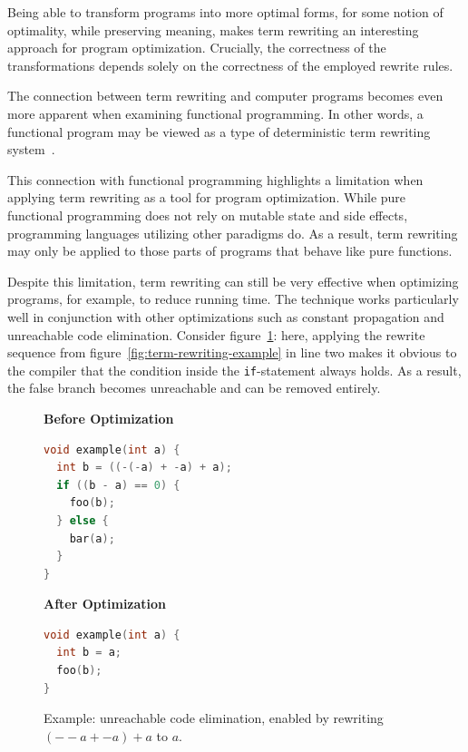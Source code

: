 Being able to transform programs into more optimal forms, for some notion of optimality, while preserving meaning, makes term rewriting an interesting approach for program optimization. Crucially, the correctness of the transformations depends solely on the correctness of the employed rewrite rules. 

The connection between term rewriting and computer programs becomes even more apparent when examining functional programming. In other words, a functional program may be viewed as a type of deterministic term rewriting system~\citep{BaaderNipkow1998}. 

This connection with functional programming highlights a limitation when applying term rewriting as a tool for program optimization. While pure functional programming does not rely on mutable state and side effects, programming languages utilizing other paradigms do. As a result, term rewriting may only be applied to those parts of programs that behave like pure functions.

Despite this limitation, term rewriting can still be very effective when optimizing programs, for example, to reduce running time. The technique works particularly well in conjunction with other optimizations such as constant propagation and unreachable code elimination. Consider figure~\ref{fig:term-rewriting-dce}: here, applying the rewrite sequence from figure~\ref{fig:term-rewriting-example} in line two makes it obvious to the compiler that the condition inside the \texttt{if}-statement always holds. As a result, the false branch becomes unreachable and can be removed entirely. 

\begin{figure}[h]
	\centering
	\begin{minipage}{0.48\textwidth}
		\centering
		\textbf{Before Optimization}\\[2pt]
		\begin{lstlisting}[language=C,basicstyle=\footnotesize\ttfamily]
void example(int a) {
  int b = ((-(-a) + -a) + a);
  if ((b - a) == 0) {
  	foo(b);
  } else {
    bar(a);
  }
}
		\end{lstlisting}
	\end{minipage}
	\hfill
	\begin{minipage}{0.48\textwidth}
		\centering
		\textbf{After Optimization}\\[2pt]
		\begin{lstlisting}[language=C,basicstyle=\footnotesize\ttfamily]
void example(int a) {
  int b = a;
  foo(b);
}
		\end{lstlisting}
	\end{minipage}
	\caption{
		Example: unreachable code elimination, enabled by rewriting $(--a + -a) + a$ to $a$.
	}
	\label{fig:term-rewriting-dce}
\end{figure}

